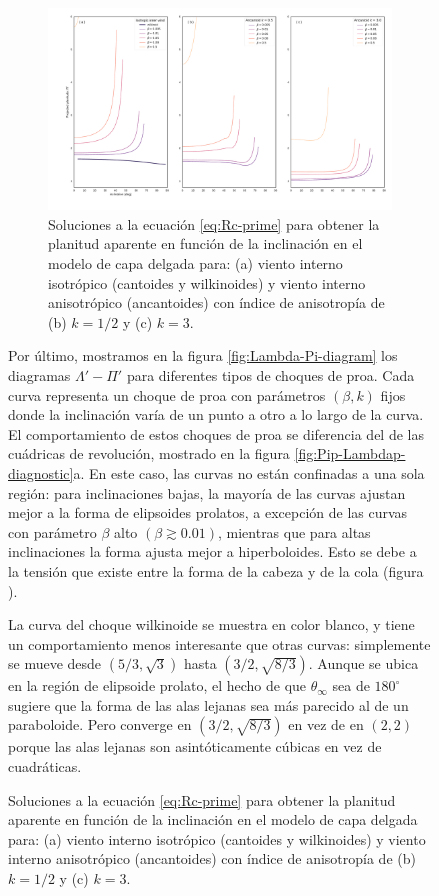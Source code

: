 \begin{figure}
\begin{figure}
  \centering
  \includegraphics[width=\linewidth]{./Figures/Pi-vs-i}
  \caption{Soluciones a la ecuación \ref{eq:Rc-prime} para obtener la planitud aparente en función de la inclinación en el modelo de capa delgada para: (a) viento interno isotrópico (cantoides y wilkinoides) y viento interno anisotrópico (ancantoides) con índice de anisotropía de (b) $k=1/2$ y (c) $k=3$.}
  \label{fig:Pi-vs-inclination}
\end{figure}

Por último, mostramos en la figura \ref{fig:Lambda-Pi-diagram} los diagramas $\Lambda'-\Pi'$ para diferentes tipos de choques de proa. Cada curva representa un choque de proa con parámetros $(\beta, k)$ fijos donde la inclinación varía de un punto a otro a lo largo de la curva. El comportamiento de estos choques de proa se diferencia del de las cuádricas de revolución, mostrado en la figura \ref{fig:Pip-Lambdap-diagnostic}a. En este caso, las curvas no están confinadas a una sola región: para inclinaciones bajas, la mayoría de las curvas ajustan mejor a la forma de elipsoides prolatos, a excepción de las curvas con parámetro $\beta$ alto $(\beta \gtrsim 0.01)$, mientras que para altas inclinaciones la forma ajusta mejor a hiperboloides. Esto se debe a la tensión que existe entre la forma de la cabeza y de la cola (figura ).

La curva del choque wilkinoide se muestra en color blanco, y tiene un comportamiento menos interesante que otras curvas: simplemente se mueve desde $(5/3, \sqrt{3})$ hasta $(3/2, \sqrt{8/3})$. Aunque se ubica en la región de elipsoide prolato, el hecho de que $\theta_\infty$ sea de $180^\circ$ sugiere que la forma de las alas lejanas sea más parecido al de un paraboloide. Pero converge en $(3/2, \sqrt{8/3})$ en vez de en $(2, 2)$ porque las alas lejanas son asintóticamente cúbicas en vez de cuadráticas.


\end{figure}
